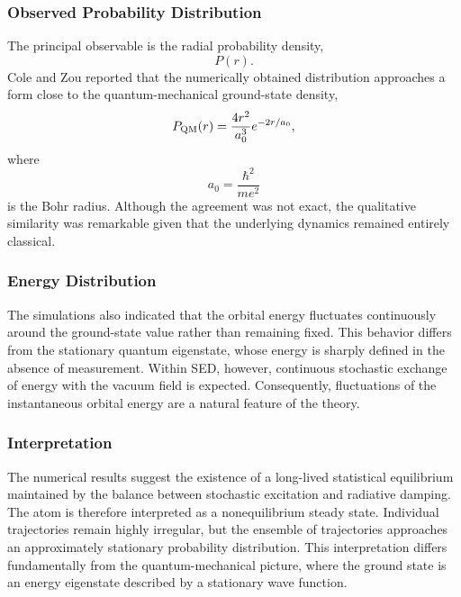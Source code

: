\subsubsection{Observed Probability Distribution}
The principal observable is the radial probability density,
\[P(r).\]
Cole and Zou reported that the numerically obtained distribution
approaches a form close to the quantum-mechanical ground-state density,
\begin{equation}
P_{\rm QM}(r)=\frac{4r^2}{a_0^3}e^{-2r/a_0},
\end{equation}
where
\[a_0=\frac{\hbar^2}{me^2}\]
is the Bohr radius.
Although the agreement was not exact, the qualitative similarity was
remarkable given that the underlying dynamics remained entirely
classical.
\subsubsection{Energy Distribution}
The simulations also indicated that the orbital energy fluctuates
continuously around the ground-state value rather than remaining fixed.
This behavior differs from the stationary quantum eigenstate, whose
energy is sharply defined in the absence of measurement.
Within SED, however, continuous stochastic exchange of energy with the
vacuum field is expected.
Consequently, fluctuations of the instantaneous orbital energy are a
natural feature of the theory.
\subsubsection{Interpretation}
The numerical results suggest the existence of a long-lived statistical
equilibrium maintained by the balance between stochastic excitation and
radiative damping.
The atom is therefore interpreted as a nonequilibrium steady state.
Individual trajectories remain highly irregular, but the ensemble of
trajectories approaches an approximately stationary probability
distribution.
This interpretation differs fundamentally from the quantum-mechanical
picture, where the ground state is an energy eigenstate described by a
stationary wave function.
